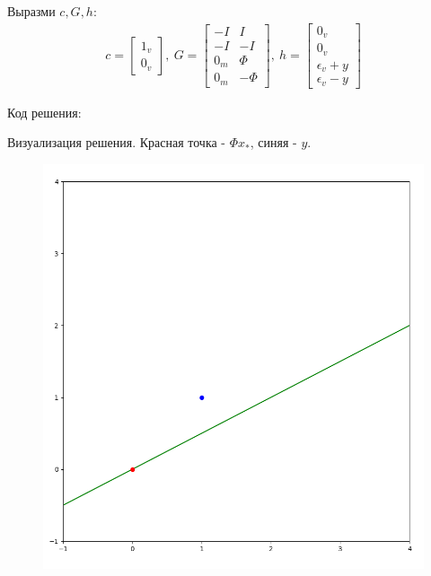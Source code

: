 \documentclass{article}
\begin{document}
    Выразми $c, G, h$:
    \begin{align*}
        c = \left[\begin{matrix} 1_v\\ 0_v \end{matrix} \right], \:
        G = \left[
            \begin{matrix}
                -I & I\\
                -I & -I \\
                0_m & \Phi \\
                0_m & -\Phi
            \end{matrix}
            \right], \:
        h = \left[
            \begin{matrix}
                0_v \\
                0_v\\
                \epsilon_v + y\\
                \epsilon_v - y
            \end{matrix}
            \right]
    \end{align*}
    
    \newpage
    Код решения:
    
    
    Визуализация решения. Красная точка - $\Phi x_*$, синяя - $y$.
    \begin{figure}[H]
        \includegraphics[width=0.8\linewidth]{Screenshots/task7_4.png}
    \end{figure}
    \bigbreak
    
\end{document}
